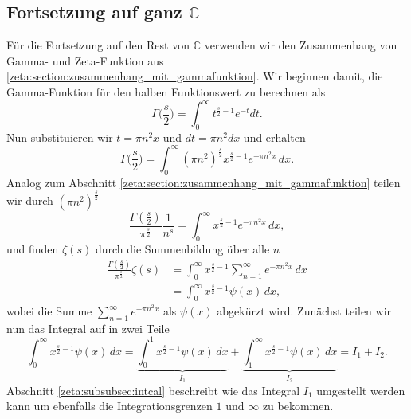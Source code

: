 \subsection{Fortsetzung auf ganz $\mathbb{C}$} \label{zeta:subsection:auf_ganz}
Für die Fortsetzung auf den Rest von $\mathbb{C}$ verwenden wir den Zusammenhang von Gamma- und Zeta-Funktion aus \ref{zeta:section:zusammenhang_mit_gammafunktion}.
Wir beginnen damit, die Gamma-Funktion für den halben Funktionswert zu berechnen als
\begin{equation}
    \Gamma \biggl( \frac{s}{2} \biggr)
    =
    \int_0^{\infty} t^{\frac{s}{2}-1} e^{-t} dt.
\end{equation}
Nun substituieren wir $t = \pi n^2 x$ und $dt=\pi n^2 dx$ und erhalten
\begin{equation}
    \Gamma \biggl( \frac{s}{2} \biggr)
    =
    \int_0^{\infty}
    (\pi n^2)^{\frac{s}{2}}
    x^{\frac{s}{2}-1}
    e^{-\pi n^2 x}
    \,dx.
\end{equation}
Analog zum Abschnitt \ref{zeta:section:zusammenhang_mit_gammafunktion} teilen wir durch $(\pi n^2)^{\frac{s}{2}}$
\begin{equation}
    \frac{\Gamma ( \frac{s}{2} )}{\pi^{\frac{s}{2}}}
    \frac{1}{n^s}
     =
    \int_0^{\infty}
    x^{\frac{s}{2}-1}
    e^{-\pi n^2 x}
    \,dx,
\end{equation}
und finden $\zeta(s)$ durch die Summenbildung über alle $n$
\begin{align}
    \frac{\Gamma ( \frac{s}{2} )}{\pi^{\frac{s}{2}}}
    \zeta(s)
    &=
    \int_0^{\infty}
    x^{\frac{s}{2}-1}
    \sum_{n=1}^{\infty}
    e^{-\pi n^2 x}
    \,dx\label{zeta:equation:integral1}
    \\
    &=
    \int_0^{\infty}
    x^{\frac{s}{2}-1}
    \psi(x)
    \,dx,
\end{align}
wobei die Summe $\sum_{n=1}^{\infty} e^{-\pi n^2 x}$ als $\psi(x)$ abgekürzt wird.
Zunächst teilen wir nun das Integral auf in zwei Teile
\begin{equation}\label{zeta:equation:integral2}
    \int_0^{\infty}
    x^{\frac{s}{2}-1}
    \psi(x)
    \,dx
    =
    \underbrace{
    \int_0^{1}
    x^{\frac{s}{2}-1}
    \psi(x)
    \,dx
    }_{\displaystyle{I_1}}
    +
    \underbrace{
    \int_1^{\infty}
    x^{\frac{s}{2}-1}
    \psi(x)
    \,dx
    }_{\displaystyle{I_2}}
    =
    I_1 + I_2.
\end{equation}
Abschnitt \ref{zeta:subsubsec:intcal} beschreibt wie das Integral $I_1$ umgestellt werden kann um ebenfalls die Integrationsgrenzen $1$ und $\infty$ zu bekommen.

